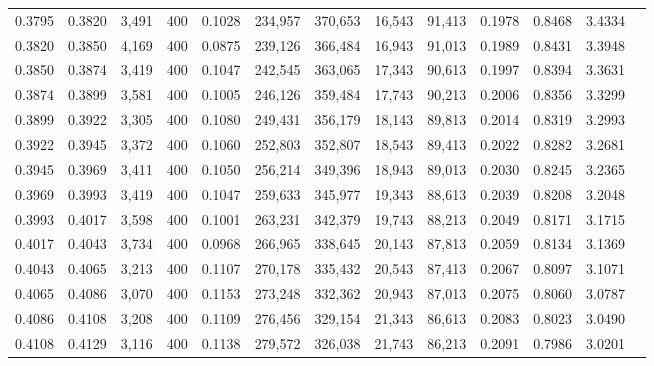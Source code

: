 \begin{tabular}{rrrrrrrrrrrrr}
0.3795 & 0.3820 &  3,491 & 400 &                                     0.1028 & 234,957 & 370,653 &  16,543 &  91,413 & 0.1978 & 0.8468 & 3.4334 \\
0.3820 & 0.3850 &  4,169 & 400 &                                     0.0875 & 239,126 & 366,484 &  16,943 &  91,013 & 0.1989 & 0.8431 & 3.3948 \\
0.3850 & 0.3874 &  3,419 & 400 &                                     0.1047 & 242,545 & 363,065 &  17,343 &  90,613 & 0.1997 & 0.8394 & 3.3631 \\
0.3874 & 0.3899 &  3,581 & 400 &                                     0.1005 & 246,126 & 359,484 &  17,743 &  90,213 & 0.2006 & 0.8356 & 3.3299 \\
0.3899 & 0.3922 &  3,305 & 400 &                                     0.1080 & 249,431 & 356,179 &  18,143 &  89,813 & 0.2014 & 0.8319 & 3.2993 \\
0.3922 & 0.3945 &  3,372 & 400 &                                     0.1060 & 252,803 & 352,807 &  18,543 &  89,413 & 0.2022 & 0.8282 & 3.2681 \\
0.3945 & 0.3969 &  3,411 & 400 &                                     0.1050 & 256,214 & 349,396 &  18,943 &  89,013 & 0.2030 & 0.8245 & 3.2365 \\
0.3969 & 0.3993 &  3,419 & 400 &                                     0.1047 & 259,633 & 345,977 &  19,343 &  88,613 & 0.2039 & 0.8208 & 3.2048 \\
0.3993 & 0.4017 &  3,598 & 400 &                                     0.1001 & 263,231 & 342,379 &  19,743 &  88,213 & 0.2049 & 0.8171 & 3.1715 \\
0.4017 & 0.4043 &  3,734 & 400 &                                     0.0968 & 266,965 & 338,645 &  20,143 &  87,813 & 0.2059 & 0.8134 & 3.1369 \\
0.4043 & 0.4065 &  3,213 & 400 &                                     0.1107 & 270,178 & 335,432 &  20,543 &  87,413 & 0.2067 & 0.8097 & 3.1071 \\
0.4065 & 0.4086 &  3,070 & 400 &                                     0.1153 & 273,248 & 332,362 &  20,943 &  87,013 & 0.2075 & 0.8060 & 3.0787 \\
0.4086 & 0.4108 &  3,208 & 400 &                                     0.1109 & 276,456 & 329,154 &  21,343 &  86,613 & 0.2083 & 0.8023 & 3.0490 \\
0.4108 & 0.4129 &  3,116 & 400 &                                     0.1138 & 279,572 & 326,038 &  21,743 &  86,213 & 0.2091 & 0.7986 & 3.0201 \\

\end{tabular}

